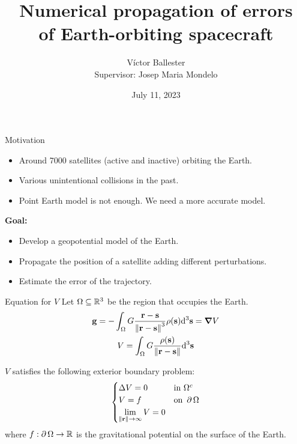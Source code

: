 \documentclass{beamer} %
\title{Numerical propagation of errors\\of Earth-orbiting spacecraft}
\author{Víctor Ballester\texorpdfstring{\vspace{0.15cm}\\}{}{\small Supervisor: Josep Maria Mondelo}}
\institute{Departament de Matemàtiques\\Facultat de Ciències}
\date{July 11, 2023}
\begin{document}
\frame{\titlepage}
\begin{frame}{Motivation}
  \begin{itemize}
    \item Around 7000 satellites (active and inactive) orbiting the Earth.
    \item Various unintentional collisions in the past.
    \item Point Earth model is not enough. We need a more accurate model.
  \end{itemize}
  \vspace{0.5cm}
  \textbf{Goal:}
  \begin{itemize}
    \item Develop a geopotential model of the Earth.
    \item Propagate the position of a satellite adding different perturbations.
    \item Estimate the error of the trajectory.
  \end{itemize}
\end{frame}
\begin{frame}{Equation for $V$}
  Let $\Omega\subseteq \mathbb{R}^3$ be the region that occupies the Earth.
  \begin{gather*}
    \boldsymbol{\mathrm{g}} = -\int_\Omega G\frac{\boldsymbol{\mathrm{r}}-\boldsymbol{\mathrm{s}}}{\left\|\boldsymbol{\mathrm{r}}-\boldsymbol{\mathrm{s}}\right\|^3}\rho(\boldsymbol{\mathrm{s}})\dd^3\boldsymbol{\mathrm{s}}=\grad V\\
    V=\int_\Omega G\frac{\rho(\boldsymbol{\mathrm{s}})}{\left\|\boldsymbol{\mathrm{r}}-\boldsymbol{\mathrm{s}}\right\|}\dd^3\boldsymbol{\mathrm{s}}
  \end{gather*}
  \begin{theorem}
    $V$ satisfies the following exterior boundary problem:
    \begin{equation*}\label{eq:dirichletProblem}
      \begin{cases}
        \Delta V = 0 & \text{in } \Omega^c    \\
        V = f            & \text{on } \operatorname{\partial}{\Omega} \\
        \displaystyle\lim_{\left\|\boldsymbol{\mathrm{r}}\right\|\to\infty}V=0
      \end{cases}
    \end{equation*}
    where $f:\operatorname{\partial}{\Omega}\to\mathbb{R}$ is the gravitational potential on the surface of the Earth.
  \end{theorem}
\end{frame}
\end{document}

